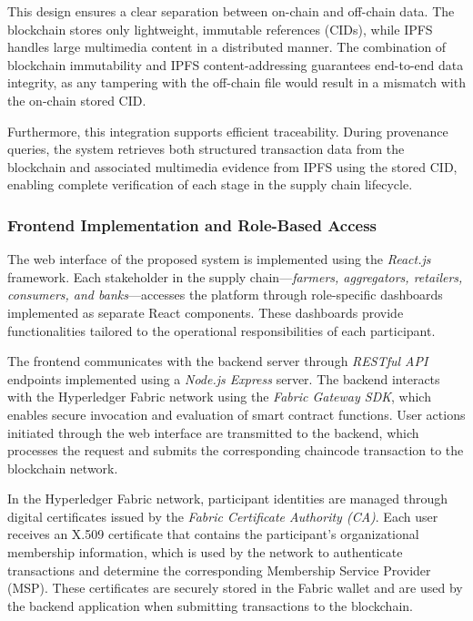 \documentclass[12pt]{article}
\begin{document}
	This design ensures a clear separation between on-chain and off-chain data. The blockchain stores only lightweight, immutable references (CIDs), while IPFS handles large multimedia content in a distributed manner. The combination of blockchain immutability and IPFS content-addressing guarantees end-to-end data integrity, as any tampering with the off-chain file would result in a mismatch with the on-chain stored CID.
	
	Furthermore, this integration supports efficient traceability. During provenance queries, the system retrieves both structured transaction data from the blockchain and associated multimedia evidence from IPFS using the stored CID, enabling complete verification of each stage in the supply chain lifecycle.
	
	
	\subsubsection{Frontend Implementation and Role-Based Access}
	
	The web interface of the proposed system is implemented using the \textit{React.js} framework. Each stakeholder in the supply chain---\textit{farmers, aggregators, retailers, consumers, and banks}---accesses the platform through role-specific dashboards implemented as separate React components. These dashboards provide functionalities tailored to the operational responsibilities of each participant.
	
	The frontend communicates with the backend server through \textit{RESTful API} endpoints implemented using a \textit{Node.js Express} server. The backend interacts with the Hyperledger Fabric network using the \textit{Fabric Gateway SDK}, which enables secure invocation and evaluation of smart contract functions. User actions initiated through the web interface are transmitted to the backend, which processes the request and submits the corresponding chaincode transaction to the blockchain network.
	
	In the Hyperledger Fabric network, participant identities are managed through digital certificates issued by the \textit{Fabric Certificate Authority (CA)}. Each user receives an X.509 certificate that contains the participant's organizational membership information, which is used by the network to authenticate transactions and determine the corresponding Membership Service Provider (MSP). These certificates are securely stored in the Fabric wallet and are used by the backend application when submitting transactions to the blockchain.
	
\end{document}
